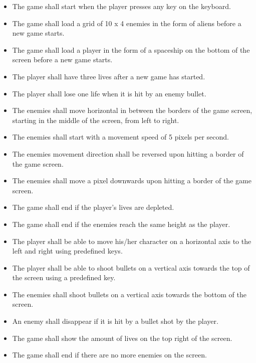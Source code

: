 \begin{itemize}
	\item The game shall start when the player presses any key on the keyboard.
	\item The game shall load a grid of 10 x 4 enemies in the form of aliens before a new game starts.
	\item The game shall load a player in the form of a spaceship on the bottom of the screen before a new game starts.
	\item The player shall have three lives after a new game has started.
	\item The player shall lose one life when it is hit by an enemy bullet.
	\item The enemies shall move horizontal in between the borders of the game screen, starting in the middle of the screen, from left to right.
	\item The enemies shall start with a movement speed of 5 pixels per second.
	\item The enemies movement direction shall be reversed upon hitting a border of the game screen.
	\item The enemies shall move a pixel downwards upon hitting a border of the game screen.
	\item The game shall end if the player's lives are depleted.
	\item The game shall end if the enemies reach the same height as the player.
	\item The player shall be able to move his/her character on a horizontal axis to the left and right using predefined keys.
	\item The player shall be able to shoot bullets on a vertical axis towards the top of the screen using a predefined key.
	\item The enemies shall shoot bullets on a vertical axis towards the bottom of the screen.
	\item An enemy shall disappear if it is hit by a bullet shot by the player.
	\item The game shall show the amount of lives on the top right of the screen.
	\item The game shall end if there are no more enemies on the screen.
\end{itemize}

